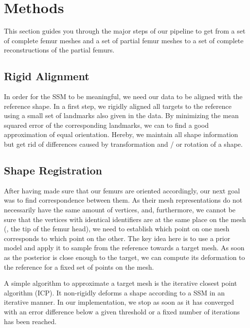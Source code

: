 \section{Methods}
\label{sec:methods}

This section guides you through the major steps of our pipeline to get from a set of complete femur meshes and a set of partial femur meshes to a set of complete reconstructions of the partial femurs.


\subsection{Rigid Alignment}
\label{subsec:rigid}

In order for the SSM to be meaningful, we need our data to be aligned with the reference shape.
In a first step, we rigidly aligned all targets  to the reference using a small set of landmarks also given in the data.
By minimizing the mean squared error of the corresponding landmarks, we can to find a good approximation of equal orientation.
Hereby, we maintain all shape information but get rid of differences caused by transformation and / or rotation of a shape.


\subsection{Shape Registration}
\label{subsec:registr}

After having made sure that our femurs are oriented accordingly, our next goal was to find correspondence between them.
As their mesh representations do not necessarily have the same amount of vertices, and, furthermore, we cannot be sure that the vertices with identical identifiers are at the same place on the mesh (\eg, the tip of the femur head), we need to establish which point on one mesh corresponds to which point on the other.
The key idea here is to use a prior model  and apply it to sample from the reference towards a target mesh.
As soon as the posterior  is close enough to the target, we can compute its deformation to the reference for a fixed set of points on the mesh.

A simple algorithm to approximate a target mesh is the iterative closest point algorithm (ICP).
It non-rigidly deforms a shape according to a SSM in an iterative manner.
In our implementation, we stop as soon as it has converged with an error difference below a given threshold or a fixed number of iterations has been reached.

\todoMissing{}

